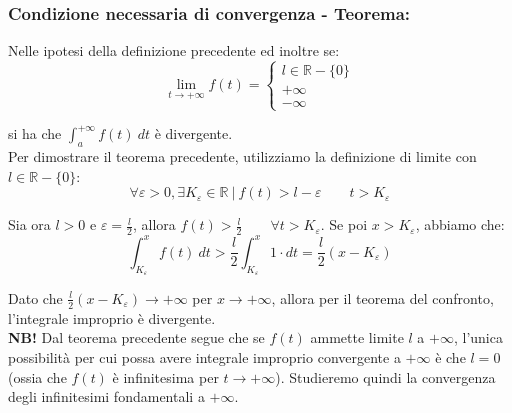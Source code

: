 \documentclass{article}
\begin{document}
\subsubsection{Condizione necessaria di convergenza - Teorema: 
} Nelle ipotesi della definizione precedente ed inoltre se:
\begin{equation*}
    \lim_{t \to +\infty} f(t) = \begin{cases}
        l \in \mathbb{R} - \{0\} \\
        +\infty \\
        -\infty
    \end{cases}
\end{equation*}

\noindent si ha che $\int_a^{+\infty} f(t) \ dt$ è divergente.\\

\noindent Per dimostrare il teorema precedente, utilizziamo la definizione di limite con $l \in \mathbb{R} - \{0\}$:
\begin{equation*}
    \forall \varepsilon > 0, \exists K_\varepsilon \in \mathbb{R} \ | \ f(t) > l - \varepsilon \qquad t > K_\varepsilon
\end{equation*}

\noindent Sia ora $l > 0$ e $\varepsilon = \frac{l}{2}$, allora $f(t) > \frac{l}{2} \qquad \forall t > K_\varepsilon$. Se poi $x > K_\varepsilon$, abbiamo che:
\begin{equation*}
    \int_{K_\varepsilon}^x f(t) \ dt > \frac{l}{2} \int_{K_\varepsilon}^x 1 \cdot dt = \frac{l}{2} (x - K_\varepsilon)
\end{equation*}

\noindent Dato che $\frac{l}{2} (x - K_\varepsilon) \to +\infty$ per $x \to +\infty$, allora per il teorema del confronto, l'integrale improprio è divergente. \\ 

\noindent\textbf{NB!} Dal teorema precedente segue che se $f(t)$ ammette limite $l$ a $+\infty$, l'unica possibilità per cui possa avere integrale improprio convergente a $+\infty$ è che $l = 0$ (ossia che $f(t)$ è infinitesima per $t \to +\infty$). Studieremo quindi la convergenza degli infinitesimi fondamentali a $+\infty$. \\
\end{document}
